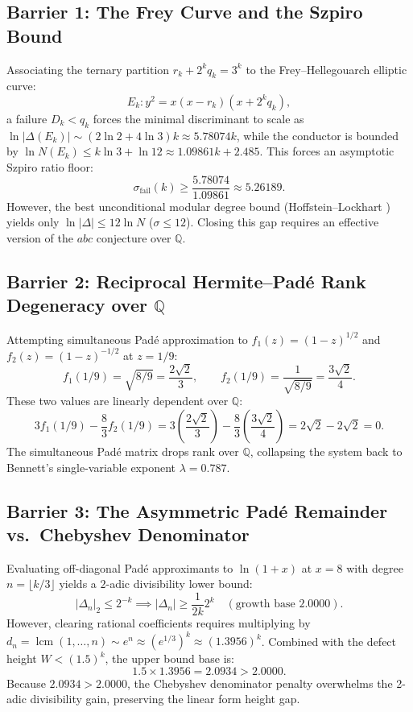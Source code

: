 \documentclass[11pt,reqno]{amsart}
\theoremstyle{definition}
\numberwithin{equation}{section}
\begin{document}
\subsection{Barrier 1: The Frey Curve and the Szpiro Bound}
Associating the ternary partition $r_k + 2^k q_k = 3^k$ to the Frey--Hellegouarch elliptic curve:
\[
E_k : y^2 = x(x - r_k)(x + 2^k q_k),
\]
a failure $D_k < q_k$ forces the minimal discriminant to scale as $\ln |\Delta(E_k)| \sim (2\ln 2 + 4\ln 3)k \approx 5.78074 k$, while the conductor is bounded by $\ln N(E_k) \le k \ln 3 + \ln 12 \approx 1.09861 k + 2.485$.
This forces an asymptotic Szpiro ratio floor:
\begin{equation}
\sigma_{\mathrm{fail}}(k) \ge \frac{5.78074}{1.09861} \approx 5.26189.
\end{equation}
However, the best unconditional modular degree bound (Hoffstein--Lockhart \cite{hoffstein1994}) yields only $\ln |\Delta| \le 12 \ln N$ ($\sigma \le 12$). Closing this gap requires an effective version of the $abc$ conjecture over $\mathbb{Q}$.

\subsection{\texorpdfstring{Barrier 2: Reciprocal Hermite--Padé Rank Degeneracy over $\mathbb{Q}$}{Barrier 2: Reciprocal Hermite--Pade Rank Degeneracy over Q}}
Attempting simultaneous Padé approximation to $f_1(z) = (1 - z)^{1/2}$ and $f_2(z) = (1 - z)^{-1/2}$ at $z = 1/9$:
\[
f_1(1/9) = \sqrt{8/9} = \frac{2\sqrt{2}}{3}, \qquad f_2(1/9) = \frac{1}{\sqrt{8/9}} = \frac{3\sqrt{2}}{4}.
\]
These two values are linearly dependent over $\mathbb{Q}$:
\[
3 f_1(1/9) - \frac{8}{3} f_2(1/9) = 3 \left(\frac{2\sqrt{2}}{3}\right) - \frac{8}{3}\left(\frac{3\sqrt{2}}{4}\right) = 2\sqrt{2} - 2\sqrt{2} = 0.
\]
The simultaneous Padé matrix drops rank over $\mathbb{Q}$, collapsing the system back to Bennett's single-variable exponent $\lambda = 0.787$.

\subsection{Barrier 3: The Asymmetric Padé Remainder vs.\ Chebyshev Denominator}
Evaluating off-diagonal Padé approximants to $\ln(1+x)$ at $x = 8$ with degree $n = \lfloor k/3 \rfloor$ yields a $2$-adic divisibility lower bound:
\[
|\Delta_n|_2 \le 2^{-k} \implies |\Delta_n| \ge \frac{1}{2k} 2^k \quad (\text{growth base } 2.0000).
\]
However, clearing rational coefficients requires multiplying by $d_n = \operatorname{lcm}(1, \dots, n) \sim e^n \approx (e^{1/3})^k \approx (1.3956)^k$.
Combined with the defect height $W < (1.5)^k$, the upper bound base is:
\begin{equation}
1.5 \times 1.3956 = \mathbf{2.0934} > \mathbf{2.0000}.
\end{equation}
Because $2.0934 > 2.0000$, the Chebyshev denominator penalty overwhelms the 2-adic divisibility gain, preserving the linear form height gap.
\end{document}
